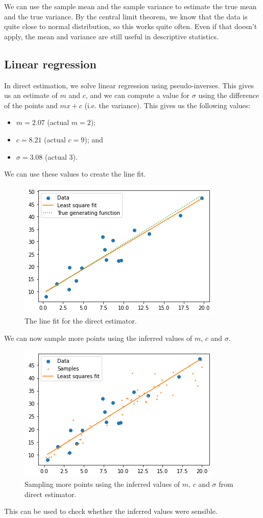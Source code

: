 \documentclass[a4paper, openany]{memoir}
\begin{document}
We can use the sample mean and the sample variance to estimate the true mean and the true variance. By the central limit theorem, we know that the data is quite close to normal distribution, so this works quite often. Even if that doesn't apply, the mean and variance are still useful in descriptive statistics.

\subsection{Linear regression}
In direct estimation, we solve linear regression using pseudo-inverses. This gives us an estimate of $m$ and $c$, and we can compute a value for $\sigma$ using the difference of the points and $mx + c$ (i.e. the variance). This gives us the following values:
\begin{itemize}
    \item $m = 2.07$ (actual $m = 2$);
    \item $c = 8.21$ (actual $c = 9$); and
    \item $\sigma = 3.08$ (actual $3$).
\end{itemize}
We can use these values to create the line fit.
\begin{figure}[H]
    \centering
    \includegraphics[scale=0.7]{src/5.26 linefit directestimation.png}
    \caption{The line fit for the direct estimator.}
\end{figure}
\noindent We can now sample more points using the inferred values of $m$, $c$ and $\sigma$.
\begin{figure}[H]
    \centering
    \includegraphics[scale=0.7]{src/5.27 sampling more from direct estimation.png}
    \caption{Sampling more points using the inferred values of $m$, $c$ and $\sigma$ from direct estimator.}
\end{figure}
\noindent This can be used to check whether the inferred values were sensible.
\end{document}
